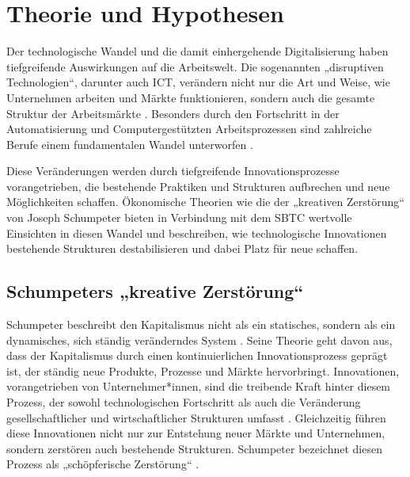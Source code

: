 
\section{Theorie und Hypothesen}

Der technologische Wandel und die damit einhergehende Digitalisierung haben tiefgreifende 
Auswirkungen auf die Arbeitswelt. Die sogenannten „disruptiven Technologien“, darunter auch 
\ac{ICT}, verändern nicht nur die Art und Weise, wie Unternehmen arbeiten und Märkte 
funktionieren, sondern auch die gesamte Struktur der Arbeitsmärkte 
\parencite[vgl.][S. 27]{brynjolfsson2014thesecond}. Besonders durch den Fortschritt in der 
Automatisierung und Computergestützten Arbeitsprozessen sind zahlreiche Berufe einem 
fundamentalen Wandel unterworfen \parencite[vgl.][S. 256]{frey2013thefuture}.

Diese Veränderungen werden durch tiefgreifende Innovationsprozesse vorangetrieben, die 
bestehende Praktiken und Strukturen aufbrechen und neue Möglichkeiten schaffen. Ökonomische 
Theorien wie die der „kreativen Zerstörung“ von Joseph Schumpeter 
\parencite[vgl.][S. 81]{schumpeter1976capitalism} bieten in Verbindung mit dem \ac{SBTC} 
wertvolle Einsichten in diesen Wandel und beschreiben, wie technologische Innovationen 
bestehende Strukturen destabilisieren und dabei Platz für neue schaffen.


\subsection{Schumpeters „kreative Zerstörung“}

Schumpeter beschreibt den Kapitalismus nicht als ein statisches, sondern als ein 
dynamisches, sich ständig veränderndes System 
\parencite[vgl.][S. 82]{schumpeter1976capitalism}. 
Seine Theorie geht davon aus, dass der Kapitalismus durch einen kontinuierlichen 
Innovationsprozess geprägt ist, der ständig neue Produkte, Prozesse und Märkte hervorbringt. 
Innovationen, vorangetrieben von Unternehmer*innen, sind die treibende Kraft hinter diesem 
Prozess, der sowohl technologischen Fortschritt als auch die Veränderung gesellschaftlicher 
und wirtschaftlicher Strukturen umfasst \parencite[vgl.][S. 82]{schumpeter1976capitalism}. 
Gleichzeitig führen diese Innovationen nicht nur zur Entstehung neuer Märkte und 
Unternehmen, sondern zerstören auch bestehende Strukturen. Schumpeter bezeichnet diesen 
Prozess als „schöpferische Zerstörung“ 
\parencite[vgl.][S. 103–105]{schumpeter1976capitalism}.

